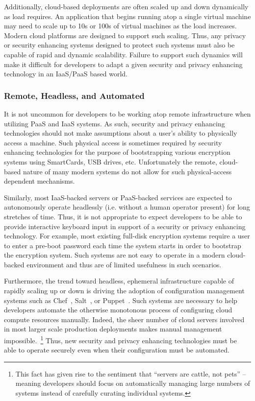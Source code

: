 Additionally, cloud-based deployments are often scaled up and down
dynamically as load requires. An application that begins running atop
a single virtual machine may need to scale up to 10s or 100s of
virtual machines as the load increases. Modern cloud platforms are
designed to support such scaling. Thus, any privacy or security
enhancing systems designed to protect such systems must also be
capable of rapid and dynamic scalability. Failure to support such
dynamics will make it difficult for developers to adapt a given
security and privacy enhancing technology in an IaaS/PaaS based world.

\subsubsection{Remote, Headless, and Automated}

It is not uncommon for developers to be working atop remote
infrastructure when utilizing PaaS and IaaS systems. As such, security
and privacy enhancing technologies should not make assumptions about a
user's ability to physically access a machine. Such physical access is
sometimes required by security enhancing technologies for the purpose
of bootstrapping various encryption systems using SmartCards, USB
drives, etc. Unfortunately the remote, cloud-based nature of many
modern systems do not allow for such physical-access dependent
mechanisms.

Similarly, most IaaS-backed servers or PaaS-backed services are
expected to autonomously operate headlessly (i.e. without a human
operator present) for long stretches of time. Thus, it is not
appropriate to expect developers to be able to provide interactive
keyboard input in support of a security or privacy enhancing
technology. For example, most existing full-disk encryption systems
require a user to enter a pre-boot password each time the system
starts in order to bootstrap the encryption system. Such systems are
not easy to operate in a modern cloud-backed environment and thus are
of limited usefulness in such scenarios.

Furthermore, the trend toward headless, ephemeral infrastructure
capable of rapidly scaling up or down is driving the adoption of
configuration management systems such as Chef~\cite{chef},
Salt~\cite{salt}, or Puppet~\cite{puppet}. Such systems are necessary
to help developers automate the otherwise monotonous process of
configuring cloud compute resources manually. Indeed, the sheer number
of cloud servers involved in most larger scale production deployments
makes manual management impossible.~\footnote{This fact has given rise
  to the sentiment that ``servers are cattle, not pets'' -- meaning
  developers should focus on automatically managing large numbers of
  systems instead of carefully curating individual systems.}  Thus,
new security and privacy enhancing technologies must be able to
operate securely even when their configuration must be automated.

